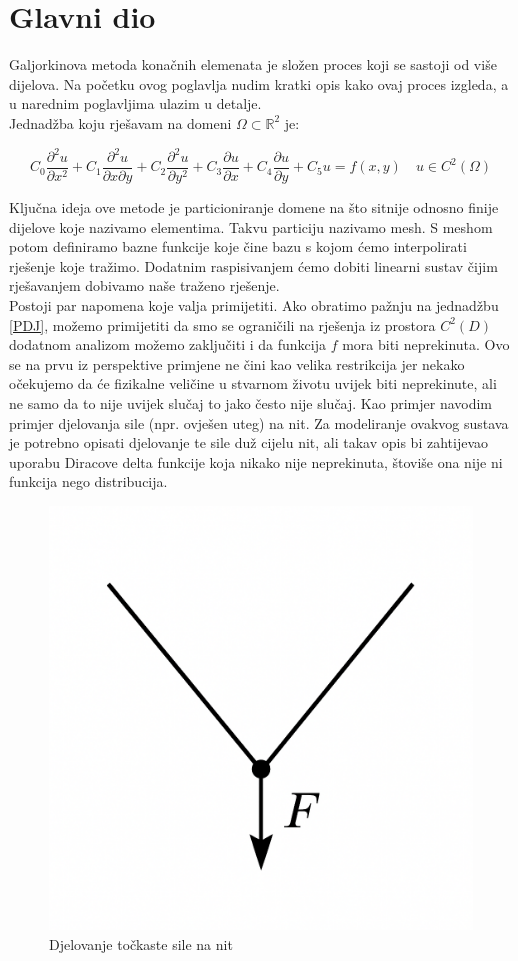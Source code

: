 \documentclass[zavrsnirad]{../fer}
\begin{document}
\chapter{Glavni dio}
\label{pog:glavni_dio}
Galjorkinova metoda konačnih elemenata je složen proces
koji se sastoji od više dijelova. Na početku ovog 
poglavlja nudim kratki opis kako ovaj proces izgleda, a
u narednim poglavljima ulazim u detalje.
\bigskip
\\ 
Jednadžba koju rješavam na domeni $\Omega \subset \mathbb{R}^2$ je:

\begin{equation}
\label{PDJ}
C_0 \frac{\partial^2 u}{\partial x^2}
+ C_1 \frac{\partial^2 u}{\partial x \partial y}
+ C_2 \frac{\partial^2 u}{\partial y^2}
+ C_3 \frac{\partial u}{\partial x}
+ C_4 \frac{\partial u}{\partial y}
+ C_5 u = f(x,y)
\quad u \in C^2(\Omega)
\end{equation}

Ključna ideja ove metode je particioniranje domene na
što sitnije odnosno finije dijelove koje nazivamo elementima.
Takvu particiju nazivamo mesh. S meshom potom definiramo
bazne funkcije koje čine bazu s kojom ćemo interpolirati
rješenje koje tražimo. Dodatnim raspisivanjem ćemo dobiti
linearni sustav čijim rješavanjem dobivamo naše traženo
rješenje.
\bigskip
\\ 
\label{uvjetNaf}
Postoji par napomena koje valja primijetiti. Ako obratimo
pažnju na jednadžbu \eqref{PDJ}, možemo primijetiti da smo
se ograničili na rješenja iz prostora $C^2(D)$ dodatnom analizom
možemo zaključiti i da funkcija $f$ mora biti neprekinuta.
Ovo se na prvu iz perspektive primjene ne čini kao velika 
restrikcija jer nekako očekujemo da će fizikalne veličine u 
stvarnom životu uvijek biti neprekinute, ali ne samo da to nije
uvijek slučaj to jako često nije slučaj. Kao primjer navodim 
primjer djelovanja sile (npr. ovješen uteg) na nit. Za modeliranje
ovakvog sustava je potrebno opisati djelovanje te sile duž
cijelu nit, ali takav opis bi zahtijevao uporabu Diracove delta 
funkcije koja nikako nije neprekinuta, štoviše ona nije
ni funkcija nego distribucija.

\begin{figure}[htb]
	\centering
	\includegraphics[width=0.38\linewidth]{Figures/nit.png}
	\caption{Djelovanje točkaste sile na nit}
	\label{nit}
\end{figure}
\end{document}

